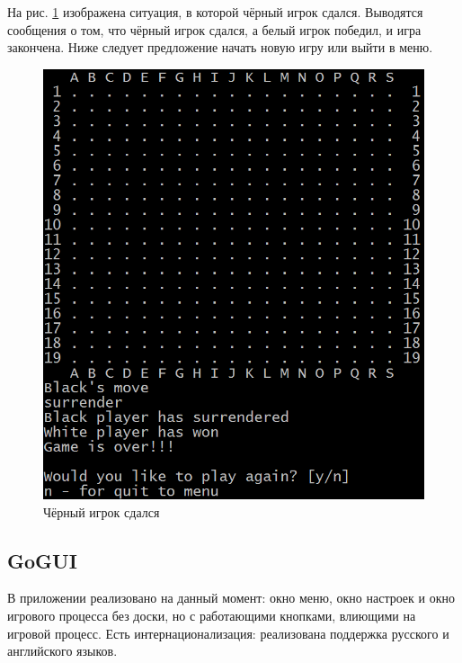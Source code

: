 На рис. \ref{pic:CUI_Surrender} изображена ситуация, в которой чёрный игрок сдался. Выводятся сообщения о том, что чёрный игрок сдался, а белый игрок победил, и игра закончена. Ниже следует предложение начать новую игру или выйти в меню.

\begin{figure}[H]
	\begin{center}
		\includegraphics[scale=0.6]{pics/GoCUI/Surrender.png}
	    \caption{Чёрный игрок сдался} 
		\label{pic:CUI_Surrender}
	\end{center}
\end{figure}

\subsection*{GoGUI}

В приложении реализовано на данный момент: окно меню, окно настроек и окно игрового процесса без доски, но с работающими кнопками,
влиющими на игровой процесс. Есть интернационализация: реализована поддержка русского и английского языков.\\

